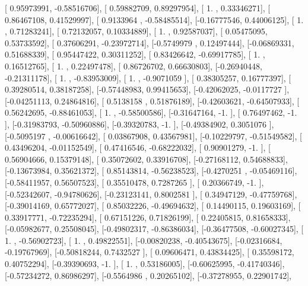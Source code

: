 \documentclass{article}
\begin{document}
       [ 0.95973991, -0.58516706],
       [ 0.59882709,  0.89297954],
       [ 1.        ,  0.33346271],
       [ 0.86467108,  0.41529997],
       [ 0.9133964 , -0.58485514],
       [-0.16777546,  0.44006125],
       [ 1.        ,  0.71283241],
       [ 0.72132057,  0.10334889],
       [ 1.        ,  0.92587037],
       [ 0.05475095,  0.53733592],
       [ 0.37606291, -0.23972714],
       [-0.5749979 ,  0.12497444],
       [-0.06869331,  0.51688339],
       [ 0.95447422,  0.30311252],
       [ 0.83426642, -0.69917785],
       [ 1.        ,  0.16512765],
       [ 1.        ,  0.22497478],
       [ 0.86726702,  0.66630803],
       [-0.26940448, -0.21311178],
       [ 1.        , -0.83953009],
       [ 1.        , -0.9071059 ],
       [ 0.38305257,  0.16777397],
       [ 0.39280514,  0.38187258],
       [-0.57448983,  0.99415653],
       [-0.42062025, -0.0117727 ],
       [-0.04251113,  0.24864816],
       [ 0.5138158 ,  0.51876189],
       [-0.42603621, -0.64507933],
       [ 0.56242695, -0.88461053],
       [ 1.        , -0.58500586],
       [-0.31647164, -1.        ],
       [ 0.76497462, -1.        ],
       [-0.31983793, -0.50960886],
       [-0.39320783, -1.        ],
       [-0.49384902,  0.3051076 ],
       [-0.5095197 , -0.00616642],
       [ 0.03867908,  0.43567981],
       [-0.10229797, -0.51549582],
       [ 0.43496204, -0.01152549],
       [ 0.47416546, -0.68222032],
       [ 0.90901279, -1.        ],
       [ 0.56904666,  0.15379148],
       [ 0.35072602,  0.33916708],
       [-0.27168112,  0.54688833],
       [-0.13673984,  0.35621372],
       [ 0.85143814, -0.56238523],
       [-0.4270251 , -0.05469116],
       [-0.58411957,  0.56507523],
       [ 0.35510478,  0.7287265 ],
       [ 0.20366749, -1.        ],
       [-0.52342607, -0.94780626],
       [-0.23123141,  0.8002581 ],
       [ 0.34947129, -0.47759768],
       [-0.39014169,  0.65772027],
       [ 0.85032226, -0.49694632],
       [ 0.14490115,  0.19603169],
       [ 0.33917771, -0.72235294],
       [ 0.67151226,  0.71826199],
       [ 0.22405815,  0.81658333],
       [-0.05982677,  0.25508045],
       [-0.49802317, -0.86386034],
       [-0.36477508, -0.60027345],
       [ 1.        , -0.56902723],
       [ 1.        ,  0.49822551],
       [-0.00820238, -0.40543675],
       [-0.02316684, -0.19767969],
       [-0.50818244,  0.7432527 ],
       [ 0.09606471,  0.43834425],
       [ 0.35598172,  0.40752294],
       [-0.39390693, -1.        ],
       [ 1.        ,  0.53186005],
       [-0.60625995, -0.41740346],
       [-0.57234272,  0.86986297],
       [-0.5564986 ,  0.20265102],
       [-0.37278955,  0.22901742],
\end{document}
